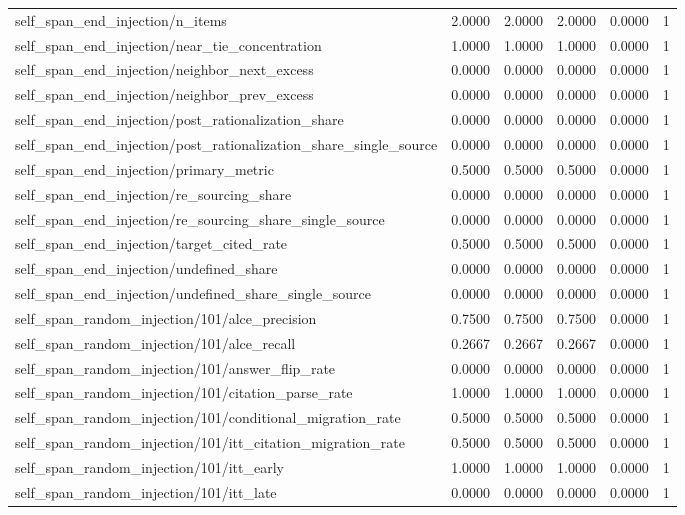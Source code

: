 \begin{table}[h]
\begin{tabular}{lrrrrr}
self_span_end_injection/n_items & 2.0000 & 2.0000 & 2.0000 & 0.0000 & 1 \\
self_span_end_injection/near_tie_concentration & 1.0000 & 1.0000 & 1.0000 & 0.0000 & 1 \\
self_span_end_injection/neighbor_next_excess & 0.0000 & 0.0000 & 0.0000 & 0.0000 & 1 \\
self_span_end_injection/neighbor_prev_excess & 0.0000 & 0.0000 & 0.0000 & 0.0000 & 1 \\
self_span_end_injection/post_rationalization_share & 0.0000 & 0.0000 & 0.0000 & 0.0000 & 1 \\
self_span_end_injection/post_rationalization_share_single_source & 0.0000 & 0.0000 & 0.0000 & 0.0000 & 1 \\
self_span_end_injection/primary_metric & 0.5000 & 0.5000 & 0.5000 & 0.0000 & 1 \\
self_span_end_injection/re_sourcing_share & 0.0000 & 0.0000 & 0.0000 & 0.0000 & 1 \\
self_span_end_injection/re_sourcing_share_single_source & 0.0000 & 0.0000 & 0.0000 & 0.0000 & 1 \\
self_span_end_injection/target_cited_rate & 0.5000 & 0.5000 & 0.5000 & 0.0000 & 1 \\
self_span_end_injection/undefined_share & 0.0000 & 0.0000 & 0.0000 & 0.0000 & 1 \\
self_span_end_injection/undefined_share_single_source & 0.0000 & 0.0000 & 0.0000 & 0.0000 & 1 \\
self_span_random_injection/101/alce_precision & 0.7500 & 0.7500 & 0.7500 & 0.0000 & 1 \\
self_span_random_injection/101/alce_recall & 0.2667 & 0.2667 & 0.2667 & 0.0000 & 1 \\
self_span_random_injection/101/answer_flip_rate & 0.0000 & 0.0000 & 0.0000 & 0.0000 & 1 \\
self_span_random_injection/101/citation_parse_rate & 1.0000 & 1.0000 & 1.0000 & 0.0000 & 1 \\
self_span_random_injection/101/conditional_migration_rate & 0.5000 & 0.5000 & 0.5000 & 0.0000 & 1 \\
self_span_random_injection/101/itt_citation_migration_rate & 0.5000 & 0.5000 & 0.5000 & 0.0000 & 1 \\
self_span_random_injection/101/itt_early & 1.0000 & 1.0000 & 1.0000 & 0.0000 & 1 \\
self_span_random_injection/101/itt_late & 0.0000 & 0.0000 & 0.0000 & 0.0000 & 1 \\

\end{tabular}
\end{table}
